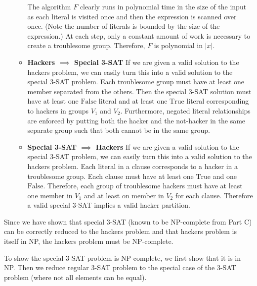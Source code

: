 \documentclass[12pt,twoside]{article}
\begin{document}
\begin{problems}
\begin{problemparts}
\begin{itemize}
\begin{itemize}
    The algorithm $F$ clearly runs in polynomial time in the size of the
    input as each literal is visited once and then the expression is scanned
    over once. (Note the number of literals is bounded by the size of the
    expression.) At each step, only a constant amount of work is necessary to
    create a troublesome group. Therefore, $F$ is polynomial in $|x|$.

    \item {\bf Hackers $\implies$ Special 3-SAT} If we are given a valid
    solution to the hackers problem, we can easily turn this into a valid
    solution to the special 3-SAT problem. Each troublesome group must have
    at least one member separated from the others. Then the special 3-SAT
    solution must have at least one $\mathrm{False}$ literal and at least one
    $\mathrm{True}$ literal corresponding to hackers in groups $V_1$ and
    $V_2$. Furthermore, negated literal relationships are enforced by putting
    both the hacker and the not-hacker in the same separate group such that
    both cannot be in the same group.
    
    \item {\bf Special 3-SAT $\implies$ Hackers} If we are given a valid
    solution to the special 3-SAT problem, we can easily turn this into a
    valid solution to the hackers problem. Each literal in a clause
    corresponds to a hacker in a troublesome group. Each clause must have at
    least one $\mathrm{True}$ and one $\mathrm{False}$. Therefore, each group
    of troublesome hackers must have at least one member in $V_1$ and at
    least on member in $V_2$ for each clause. Therefore a valid special 3-SAT
    implies a valid hacker partition.

  \end{itemize}

\end{itemize}

Since we have shown that special 3-SAT (known to be NP-complete from Part C)
can be correctly reduced to the hackers problem and that hackers problem is
itself in NP, the hackers problem must be NP-complete.

\problempart  %

To show the special 3-SAT problem is NP-complete, we first show that it is in
NP. Then we reduce regular 3-SAT problem to the special case of the 3-SAT
problem (where not all elements can be equal).

\begin{itemize}


\end{itemize}
\end{problemparts}
\end{problems}
\end{document}
